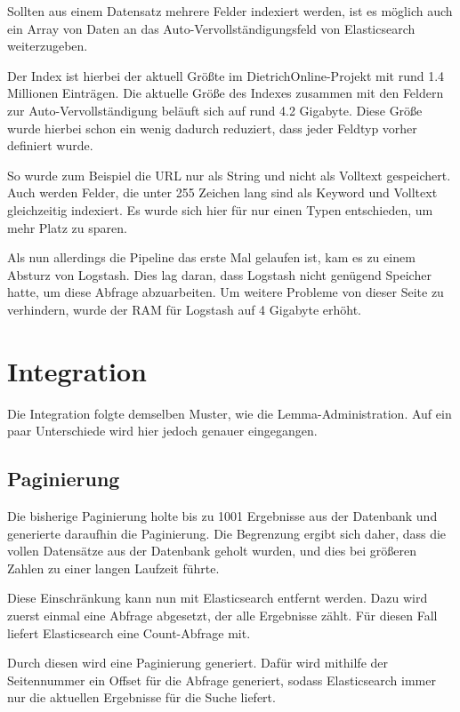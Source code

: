 Sollten aus einem Datensatz mehrere Felder indexiert werden, ist es möglich auch ein Array von Daten an das Auto-Vervollständigungsfeld von Elasticsearch weiterzugeben.

Der Index ist hierbei der aktuell Größte im DietrichOnline-Projekt mit rund 1.4 Millionen Einträgen. Die aktuelle Größe des Indexes zusammen mit den Feldern zur Auto-Vervollständigung beläuft sich auf rund 4.2 Gigabyte. 
Diese Größe wurde hierbei schon ein wenig dadurch reduziert, dass jeder Feldtyp vorher definiert wurde.

So wurde zum Beispiel die URL nur als String und nicht als Volltext gespeichert. Auch werden Felder, die unter 255 Zeichen lang sind als Keyword und Volltext gleichzeitig indexiert. Es wurde sich hier für nur einen Typen entschieden, um mehr Platz zu sparen.

Als nun allerdings die Pipeline das erste Mal gelaufen ist, kam es zu einem Absturz von Logstash. Dies lag daran, dass Logstash nicht genügend Speicher hatte, um diese Abfrage abzuarbeiten. Um weitere Probleme von dieser Seite zu verhindern, wurde der RAM für Logstash auf 4 Gigabyte erhöht.

\section{Integration}

Die Integration folgte demselben Muster, wie die Lemma-Administration. Auf ein paar Unterschiede wird hier jedoch genauer eingegangen. 

\subsection{Paginierung}

Die bisherige Paginierung holte bis zu 1001 Ergebnisse aus der Datenbank und generierte daraufhin die Paginierung. Die Begrenzung ergibt sich daher, dass die vollen Datensätze aus der Datenbank geholt wurden, und dies bei größeren Zahlen zu einer langen Laufzeit führte.

Diese Einschränkung kann nun mit Elasticsearch entfernt werden. Dazu wird zuerst einmal eine Abfrage abgesetzt, der alle Ergebnisse zählt. Für diesen Fall liefert Elasticsearch eine Count-Abfrage mit.

Durch diesen wird eine Paginierung generiert. Dafür wird mithilfe der Seitennummer ein Offset für die Abfrage generiert, sodass Elasticsearch immer nur die aktuellen Ergebnisse für die Suche liefert.

